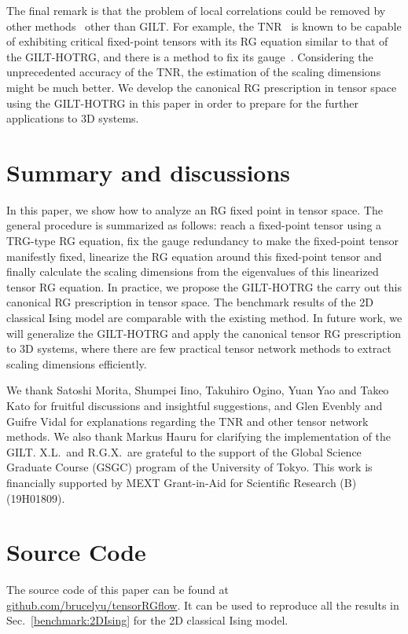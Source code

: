 \documentclass[aps,prr,reprint,superscriptaddress,floatfix]{revtex4-2}
\begin{document}
The final remark is that the problem of local correlations could be removed by other methods~\cite{GuWen2009,tnr,tnralgo,tnrplus,looptnr,harada2018,fet,tns,tensor-ring} other than GILT.
For example, the TNR~\cite{tnr,tnralgo} is known to be capable of exhibiting critical fixed-point tensors with its RG equation similar to that of the GILT-HOTRG, and there is a method to fix its gauge~\cite{tnralgo}. 
Considering the unprecedented accuracy of the TNR, the estimation of the scaling dimensions might be much better.
We develop the canonical RG prescription in tensor space using the GILT-HOTRG in this paper in order to prepare for the further applications to 3D systems.
%


\section{Summary and discussions\label{conclusion}}
In this paper, we show how to analyze an RG fixed point in tensor space.
The general procedure is summarized as follows: reach a fixed-point tensor using a TRG-type RG equation, fix the gauge redundancy to make the fixed-point tensor manifestly fixed, linearize the RG equation around this fixed-point tensor and finally calculate the scaling dimensions from the eigenvalues of this linearized tensor RG equation.
In practice, we propose the GILT-HOTRG the carry out this canonical RG prescription in tensor space.
The benchmark results of the 2D classical Ising model are comparable with the existing method.
In future work, we will generalize the GILT-HOTRG and apply the canonical tensor RG prescription to 3D systems, where there are few practical tensor network methods to extract scaling dimensions efficiently. 




\begin{acknowledgments}
We thank Satoshi Morita, Shumpei Iino, Takuhiro Ogino, Yuan Yao and Takeo Kato for fruitful discussions and insightful suggestions, and Glen Evenbly and Guifre Vidal for explanations regarding the TNR and other tensor network methods. 
We also thank Markus Hauru for clarifying the implementation of the GILT.
X.L.\ and R.G.X.\ are grateful to the support of the Global Science Graduate Course (GSGC) program of the University of Tokyo. 
This work is financially supported by MEXT Grant-in-Aid for Scientific Research (B) (19H01809).

\end{acknowledgments}

\appendix
\section{Source Code\label{append:sc}}
The source code of this paper can be found at \href{https://github.com/brucelyu/tensorRGflow}{github.com/brucelyu/tensorRGflow}.
It can be used to reproduce all the results in Sec.~\ref{benchmark:2DIsing} for the 2D classical Ising model.


\end{document}
